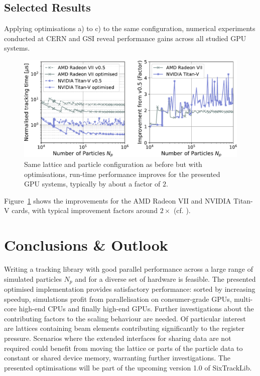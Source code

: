 \documentclass[a4paper,
               refpage,       %
               keeplastbox,   %
               ]{jacow}
\begin{document}
\subsection{Selected Results}
Applying optimisations a) to c) to the same configuration, numerical experiments conducted at CERN and GSI reveal performance gains across all studied GPU systems.
\begin{figure}[h!bt]
    \centering 
    \includegraphics*[width=\columnwidth]{fig_performance_optimisation}
    \caption{Same lattice and particle configuration as before but with optimisations, run-time performance improves for the presented GPU systems, typically by about a factor of $2$.}
    \label{fig:optimised_performance}
\end{figure}
Figure~\ref{fig:optimised_performance} shows the improvements for the AMD Radeon VII and NVIDIA Titan-V cards, with typical improvement factors around $2\times$ (cf. \cite{data-2021}).

\section{Conclusions \& Outlook}
Writing a tracking library with good parallel performance across a large range of simulated particles $N_{p}$ and for a diverse set of hardware is feasible. The presented optimised implementation provides satisfactory performance:
sorted by increasing speedup, simulations profit from parallelisation on consumer-grade GPUs, multi-core high-end CPUs and finally high-end GPUs. 
Further investigations about the contributing factors to the scaling behaviour are needed. Of particular interest are lattices containing beam elements contributing significantly to the register pressure. Scenarios where the extended interfaces for sharing data are not required could benefit from moving the lattice or parts of the particle data to constant or shared device memory, warranting further investigations. The presented optimisations will be part of the upcoming version 1.0 of SixTrackLib.
\end{document}

